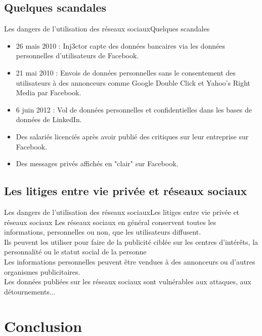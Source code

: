 \documentclass{beamer}
\begin{document}
\subsection{Quelques scandales}
\begin{frame}{Les dangers de l'utilisation des réseaux sociaux}{Quelques scandales}
	\begin{itemize}
		\item 26 mais 2010 : Inj3ctor capte des données bancaires via les données personnelles d'utilisateurs de Facebook.
		\item 21 mai 2010 : Envois de données personnelles sans le consentement des utilisateurs à des annonceurs comme Google Double Click et Yahoo's Right Media par Facebook.
		\item 6 juin 2012 : Vol de données personnelles et confidentielles dans les bases de données de LinkedIn.
		\item Des salariés licenciés après avoir publié des critiques sur leur entreprise sur Facebook.
		\item Des messages privés affichés en "clair" sur Facebook.
	\end{itemize}
\end{frame}
\subsection{Les litiges entre vie privée et réseaux sociaux}
\begin{frame}{Les dangers de l'utilisation des réseaux sociaux}{Les litiges entre vie privée et réseaux sociaux}
	Les réseaux sociaux en général conservent toutes les informations, personnelles ou non, que les utilisateurs diffusent. \\
	Ils peuvent les utiliser pour faire de la publicité ciblée sur les centres d'intérêts, la personnalité ou le statut social de la personne\\
	Les informations personnelles peuvent être vendues à des annonceurs ou d'autres organismes publicitaires.\\
	Les données publiées sur les réseaux sociaux sont vulnérables aux attaques, aux détournements...\\
\end{frame}


\section*{Conclusion}
\end{document}
